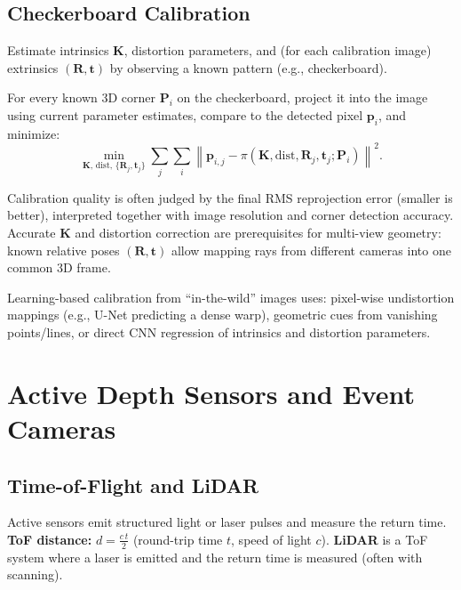\documentclass[11pt, oneside]{book}
\newcommand{\norm}[1]{\left\lVert #1 \right\rVert}
\newcommand{\vct}[1]{\bm{#1}}           %
\newcommand{\mat}[1]{\mathbf{#1}}       %
\begin{document}
\subsection{Checkerboard Calibration}

\begin{defbox}[title={Camera Calibration}]
Estimate intrinsics $\mat{K}$, distortion parameters, and (for each calibration image) extrinsics $(\mat{R},\vct{t})$
by observing a known pattern (e.g., checkerboard).
\end{defbox}

\begin{thmbox}[title={Reprojection Error Minimization}]
For every known 3D corner $\vct{P}_i$ on the checkerboard, project it into the image using current parameter estimates,
compare to the detected pixel $\vct{p}_i$, and minimize:
\[
\min_{\mat{K},\,\text{dist},\,\{\mat{R}_j,\vct{t}_j\}}
\sum_{j}\sum_{i}\norm{\vct{p}_{i,j} - \pi(\mat{K},\text{dist},\mat{R}_j,\vct{t}_j;\vct{P}_i)}^2.
\]
\end{thmbox}

Calibration quality is often judged by the final RMS reprojection error (smaller is better),
interpreted together with image resolution and corner detection accuracy.
Accurate $\mat{K}$ and distortion correction are prerequisites for multi-view geometry:
known relative poses $(\mat{R},\vct{t})$ allow mapping rays from different cameras into one common 3D frame.

Learning-based calibration from ``in-the-wild'' images uses: pixel-wise undistortion mappings (e.g., U-Net predicting
a dense warp), geometric cues from vanishing points/lines, or direct CNN regression of intrinsics and distortion parameters.

\section{Active Depth Sensors and Event Cameras}

\subsection{Time-of-Flight and LiDAR}

Active sensors emit structured light or laser pulses and measure the return time.
\textbf{ToF distance:} $d = \frac{c\,t}{2}$ (round-trip time $t$, speed of light $c$).
\textbf{LiDAR} is a ToF system where a laser is emitted and the return time is measured (often with scanning).
\end{document}
